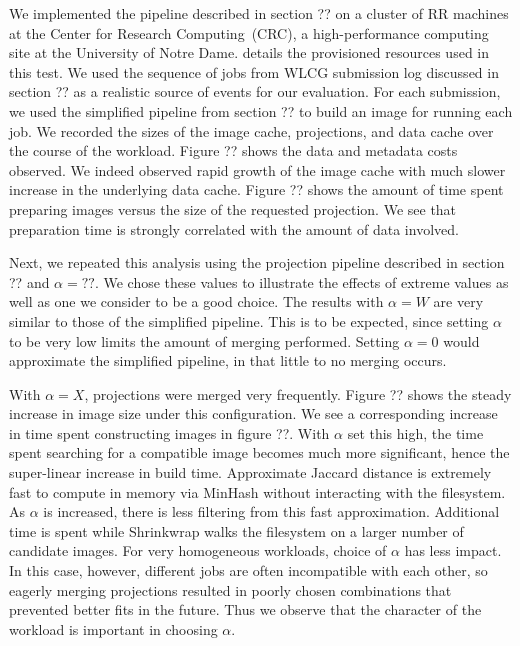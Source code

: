 \documentclass[conference]{IEEEtran}
\begin{document}
We implemented the pipeline described in section ?? on a cluster of RR machines at the Center for Research Computing~(CRC),
a high-performance computing site at the University of Notre Dame.
 details the provisioned resources used in this test.
We used the sequence of jobs from WLCG submission log discussed in section ?? as a realistic source of events for our evaluation.
For each submission,
we used the simplified pipeline from section ?? to build an image for running each job.
We recorded the sizes of the image cache, projections, and data cache over the course of the workload.
Figure ?? shows the data and metadata costs observed.
We indeed observed rapid growth of the image cache with much slower increase in the underlying data cache.
Figure ?? shows the amount of time spent preparing images versus the size of the requested projection.
We see that preparation time is strongly correlated with the amount of data involved.

Next, we repeated this analysis using the projection pipeline described in section ?? and $\alpha = ??$.
We chose these values to illustrate the effects of extreme values as well as one we consider to be a good choice.
The results with $\alpha = W$ are very similar to those of the simplified pipeline.
This is to be expected,
since setting $\alpha$ to be very low limits the amount of merging performed.
Setting $\alpha = 0$ would approximate the simplified pipeline,
in that little to no merging occurs.

With $\alpha = X$,
projections were merged very frequently.
Figure ?? shows the steady increase in image size under this configuration.
We see a corresponding increase in time spent constructing images in figure ??.
With $\alpha$ set this high,
the time spent searching for a compatible image becomes much more significant,
hence the super-linear increase in build time.
Approximate Jaccard distance is extremely fast to compute in memory via MinHash without interacting with the filesystem.
As $\alpha$ is increased,
there is less filtering from this fast approximation.
Additional time is spent while Shrinkwrap walks the filesystem on a larger number of candidate images.
For very homogeneous workloads,
choice of $\alpha$ has less impact.
In this case, however,
different jobs are often incompatible with each other,
so eagerly merging projections resulted in poorly chosen combinations that prevented better fits in the future.
Thus we observe that the character of the workload is important in choosing $\alpha$.
\end{document}
